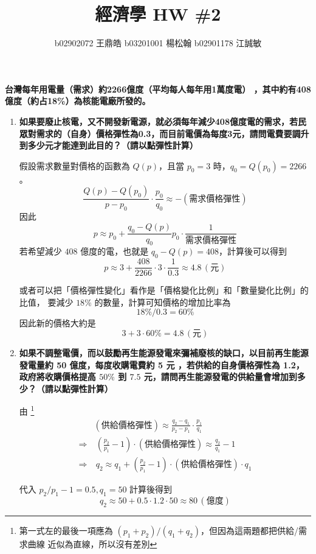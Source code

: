 \documentclass[12pt, a4paper]{article}
\title{\vspace{-1.5cm} 經濟學 HW \#2}
\author{b02902072 王鼎皓 \quad b03201001 楊松翰 \quad b02901178 江誠敏}
\begin{document}
\maketitle
{\bf 台灣每年用電量（需求）約2266億度（平均每人每年用1萬度電）
  ，其中約有408億度（約占18\%）為核能電廠所發的。}


\begin{enumerate}[label=(\arabic*)]
  \item {\bf 如果要廢止核電，又不開發新電源，就必須每年減少408億度電的需求，若民眾對需求的（自身）價格彈性為0.3，而目前電價為每度3元，請問電費要調升到多少元才能達到此目的？（請以點彈性計算）}

  假設需求數量對價格的函數為 $Q(p)$，且當 $p_0 = 3$ 時，$q_0 = Q(p_0) = 2266$。
  \[
    \frac{Q(p) - Q(p_0)}{p - p_0} \cdot \frac{p_0}{q_0} \approx -(\text{需求價格彈性})
  \]
  因此
  \[ p \approx p_0 + \frac{q_0 - Q(p)}{q_0} p_0 \cdot \frac{1}{\text{需求價格彈性}} \]
  若希望減少 $408$ 億度的電，也就是 $q_0 - Q(p) = 408$，計算後可以得到
  \[ p \approx 3 + \frac{408}{2266} \cdot 3 \cdot \frac{1}{0.3} \approx 4.8 \,(\text{元}) \]

  或者可以把「價格彈性變化」看作是「價格變化比例」和「數量變化比例」的比值，
  要減少 $18 \%$ 的數量，計算可知價格的增加比率為
  \[ 18 \% / 0.3 = 60 \% \]
  因此新的價格大約是
  \[ 3 + 3 \cdot 60 \% = 4.8 \, (元) \]

  \clearpage

  \item {\bf 如果不調整電價，而以鼓勵再生能源發電來彌補廢核的缺口，以目前再生能源發電量約 50 億度，每度收購電費約 5 元
      ，若供給的自身價格彈性為 1.2，政府將收購價格提高 $50\%$ 到 
      $7.5$ 元，請問再生能源發電的供給量會增加到多少？（請以點彈性計算）}

    由 \footnote{第一式左的最後一項應為 $(p_1+p_2) / (q_1+q_2)$，但因為這兩題都把供給/需求曲線
    近似為直線，所以沒有差別}
    \begin{align*}
      & (供給價格彈性) \approx \frac{q_2 - q_1}{p_2 - p_1} \cdot \frac{p_1}{q_1}  \quad \\
      \Rightarrow & \ \left(\frac{p_2}{p_1} - 1\right) \cdot (供給價格彈性) \approx \frac{q_2}{q_1} - 1 \\
      \Rightarrow & \ q_2 \approx q_1 + \left(\frac{p_2}{p_1} - 1\right) \cdot (供給價格彈性) \cdot q_1
    \end{align*}

    代入 $p_2 / p_1 - 1 = 0.5, q_1 = 50$ 計算後得到
    \[ q_2 \approx 50 + 0.5 \cdot 1.2 \cdot 50 \approx 80 \, (億度) \]



\end{enumerate}
\end{document}
